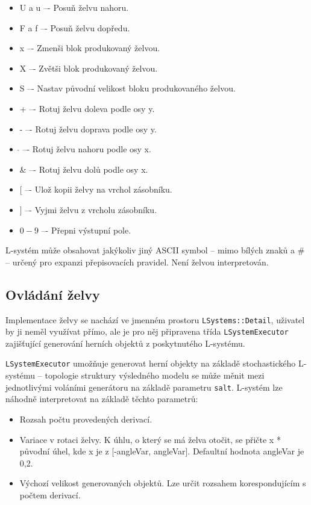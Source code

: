 \documentclass[thesis=M,czech]{FITthesis}[2019/12/23]
\begin{document}
\begin{itemize}
\item U a u –- Posuň želvu nahoru.
\item F a f –- Posuň želvu dopředu.
\item x –- Zmenši blok produkovaný želvou.
\item X –- Zvětši blok produkovaný želvou.
\item S –- Nastav původní velikost bloku produkovaného želvou.
\item + –- Rotuj želvu doleva podle osy y.
\item - –- Rotuj želvu doprava podle osy y.
\item $\hat{}$ –- Rotuj želvu nahoru podle osy x.
\item \& –- Rotuj želvu dolů podle osy x.
\item $[$ –- Ulož kopii želvy na vrchol zásobníku.
\item $]$ –- Vyjmi želvu z vrcholu zásobníku.
\item $0-9$ –- Přepni výstupní pole.
\end{itemize}

L-systém může obsahovat jakýkoliv jiný ASCII symbol -- mimo bílých znaků a \# -- určený pro expanzi přepisovacích pravidel. Není želvou interpretován.

\subsection{Ovládání želvy}
Implementace želvy se nachází ve jmenném prostoru \texttt{LSystems::Detail}, uživatel by ji neměl využívat přímo, ale je pro něj připravena třída \texttt{LSystemExecutor} zajišťující generování herních objektů z poskytnutého L-systému.

\texttt{LSystemExecutor} umožňuje generovat herní objekty na základě stochastického L-systému -- topologie struktury výsledného modelu se může měnit mezi jednotlivými voláními generátoru na základě parametru \texttt{salt}. L-systém lze náhodně interpretovat na základě těchto parametrů:

\begin{itemize}
\item Rozsah počtu provedených derivací.
\item Variace v rotaci želvy. K úhlu, o který se má želva otočit, se přičte x * původní úhel, kde x je z [-angleVar, angleVar]. Defaultní hodnota angleVar je 0,2.
\item Výchozí velikost generovaných objektů. Lze určit rozsahem korespondujícím s počtem derivací.
\end{itemize}
\end{document}

